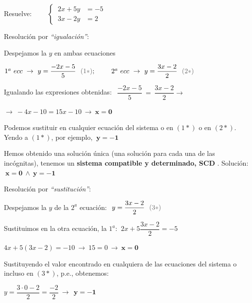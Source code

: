 \begin{miejemplo}

Resuelve: $\qquad \begin{cases} \ 2x+5y&=-5 \\ \ 3x-2y&=2 \end{cases}$	

\vspace{5mm} Resolución por \emph{``igualación''}:

\vspace{2mm} Despejamos la $y$ en ambas ecuaciones 

\vspace{2mm} $1^a\ ecc \ \to \  y=\dfrac{-2x-5}{5}\ \ \textcolor{gris}{(1*)};  \qquad\ 2^a\ ecc \ \to \  y=\dfrac{3x-2}{2}\  \ \textcolor{gris}{(2*)}$

\vspace{2mm} Igualando las expresiones obtenidas:  $\ \ \dfrac{-2x-5}{5}\ = \ \dfrac{3x-2}{2} \to $

\vspace{2mm} $\to \ -4x-10=15x-10 \ \to \ \boldsymbol{x=0}$

\vspace{2mm} Podemos sustituir en cualquier ecuación del sistema o en $(1*)$ o en $(2*)$. Yendo a $(1*)$, por ejemplo, $\ \boldsymbol{y=-1}$

\vspace{2mm} Hemos obtenido una solución única (una solución para cada una de las incógnitas), tenemos un \textbf{sistema compatible y determinado, SCD} . Solución: $	\ \boldsymbol{x=0\ \wedge \ y=-1}$

\vspace{7mm} Resolución por \emph{``sustitución''}:

\vspace{2mm} Despejamos la $y$ de la $2^a$ ecuación: $\ y=\dfrac{3x-2}{2}\ \ \textcolor{gris}{(3*)}$

\vspace{2mm} Sustituimos en la otra ecuación, la $1^a$: $\ 2x+5\dfrac{3x-2}{2}=-5$

\vspace{2mm} $4x+5(3x-2)=-10\ \to \ 15=0 \ \to \ \boldsymbol{x=0}$

\vspace{2mm} Sustituyendo el valor encontrado en cualquiera de las ecuaciones del sistema o incluso en $(3*)$, p.e., obtenemos:

\vspace{2mm} $y=\dfrac{3\cdot 0-2}{2} = \dfrac {-2}{2} \ \to \ 	\  \boldsymbol{y=-1}$


\end{miejemplo}

